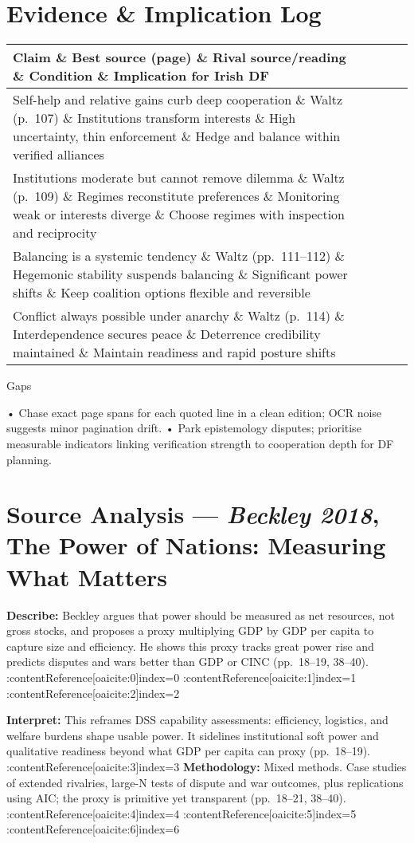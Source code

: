 \section*{Evidence \& Implication Log}
\begin{tabular}{p{3.2cm}p{4.2cm}p{3.6cm}p{3.2cm}p{4.2cm}}
		\textbf{Claim} \& \textbf{Best source (page)} \& \textbf{Rival source/reading} \& \textbf{Condition} \& \textbf{Implication for Irish DF}\\\hline
		Self-help and relative gains curb deep cooperation \& Waltz (p.~107) \& Institutions transform interests \& High uncertainty, thin enforcement \& Hedge and balance within verified alliances\\
		Institutions moderate but cannot remove dilemma \& Waltz (p.~109) \& Regimes reconstitute preferences \& Monitoring weak or interests diverge \& Choose regimes with inspection and reciprocity\\
		Balancing is a systemic tendency \& Waltz (pp.~111--112) \& Hegemonic stability suspends balancing \& Significant power shifts \& Keep coalition options flexible and reversible\\
		Conflict always possible under anarchy \& Waltz (p.~114) \& Interdependence secures peace \& Deterrence credibility maintained \& Maintain readiness and rapid posture shifts\\
\end{tabular}
Gaps

• Chase exact page spans for each quoted line in a clean edition; OCR noise suggests minor pagination drift.
• Park epistemology disputes; prioritise measurable indicators linking verification strength to cooperation depth for DF planning.

\parencite{BECKLEY_2018}


\section*{Source Analysis — \textit{Beckley 2018}, The Power of Nations: Measuring What Matters}
\textbf{Describe:} Beckley argues that power should be measured as net resources, not gross stocks, and proposes a proxy multiplying GDP by GDP per capita to capture size and efficiency. He shows this proxy tracks great power rise and predicts disputes and wars better than GDP or CINC (pp.~18–19, 38–40). :contentReference[oaicite:0]{index=0} :contentReference[oaicite:1]{index=1} :contentReference[oaicite:2]{index=2}

\textbf{Interpret:} This reframes DSS capability assessments: efficiency, logistics, and welfare burdens shape usable power. It sidelines institutional soft power and qualitative readiness beyond what GDP per capita can proxy (pp.~18–19). :contentReference[oaicite:3]{index=3}
\textbf{Methodology:} Mixed methods. Case studies of extended rivalries, large-N tests of dispute and war outcomes, plus replications using AIC; the proxy is primitive yet transparent (pp.~18–21, 38–40). :contentReference[oaicite:4]{index=4} :contentReference[oaicite:5]{index=5} :contentReference[oaicite:6]{index=6}

